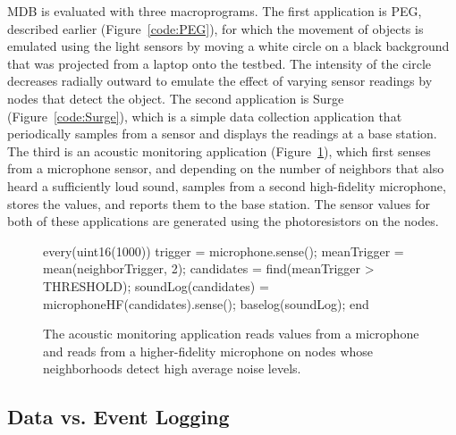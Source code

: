 MDB is evaluated with three macroprograms.  The first application is PEG,
described earlier (Figure~\ref{code:PEG}), for which the movement of objects is
emulated using the light sensors by moving a white circle on a black background
that was projected from a laptop onto the testbed. The intensity of the circle
decreases radially outward to emulate the effect of varying sensor readings by
nodes that detect the object.  The second application is Surge
(Figure~\ref{code:Surge}), which is a simple data collection application that
periodically samples from a sensor and displays the readings at a base station.
The third is an acoustic monitoring application (Figure~\ref{code:acoustic}),
which first senses from a microphone sensor, and depending on the number of
neighbors that also heard a sufficiently loud sound, samples from a second
high-fidelity microphone, stores the values, and reports them to the base
station.  The sensor values for both of these applications are generated using
the photoresistors on the nodes.


\begin{figure}[t]
\begin{macrolab}
every(uint16(1000))
 trigger = microphone.sense();
 meanTrigger = mean(neighborTrigger, 2);
 candidates = find(meanTrigger > THRESHOLD);
 soundLog(candidates) = microphoneHF(candidates).sense();
 baselog(soundLog);
end
\end{macrolab}
\caption[An acoustic monitoring application in MacroLab]{The acoustic monitoring
application reads values from a microphone and reads from a higher-fidelity
microphone on nodes whose neighborhoods detect high average noise levels.}
\label{code:acoustic}
\end{figure}

\subsection{Data vs. Event Logging} \label{dataEvent}

